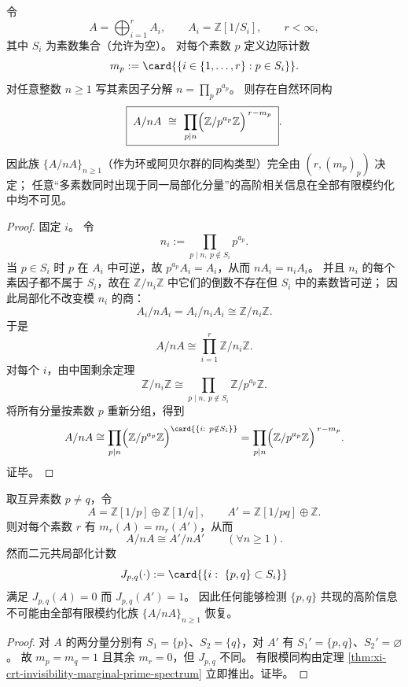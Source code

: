 \begin{theorem}\label{thm:xi-crt-invisibility-marginal-prime-spectrum}
令
\[
A=\bigoplus_{i=1}^{r}A_i,
\qquad
A_i=\mathbb Z[1/S_i],
\qquad
r<\infty,
\]
其中 \(S_i\) 为素数集合（允许为空）。
对每个素数 \(p\) 定义边际计数
\[
m_p:=\card{\{i\in\{1,\dots,r\}:p\in S_i\}}.
\]
对任意整数 \(n\ge 1\) 写其素因子分解 \(n=\prod_{p}p^{a_p}\)。
则存在自然环同构
\[
\boxed{\;
A/nA\ \cong\ \prod_{p\mid n}\Bigl(\mathbb Z/p^{a_p}\mathbb Z\Bigr)^{\,r-m_p}\; }.
\]
因此族 \(\{A/nA\}_{n\ge 1}\)（作为环或阿贝尔群的同构类型）完全由 \((r,(m_p)_p)\) 决定；
任意“多素数同时出现于同一局部化分量”的高阶相关信息在全部有限模约化中均不可见。
\end{theorem}
\begin{proof}
固定 \(i\)。
令
\[
n_i:=\prod_{p\mid n,\ p\notin S_i}p^{a_p}.
\]
当 \(p\in S_i\) 时 \(p\) 在 \(A_i\) 中可逆，故 \(p^{a_p}A_i=A_i\)，从而 \(nA_i=n_iA_i\)。
并且 \(n_i\) 的每个素因子都不属于 \(S_i\)，故在 \(\mathbb Z/n_i\mathbb Z\) 中它们的倒数不存在但 \(S_i\) 中的素数皆可逆；
因此局部化不改变模 \(n_i\) 的商：
\[
A_i/nA_i=A_i/n_iA_i\cong \mathbb Z/n_i\mathbb Z.
\]
于是
\[
A/nA\cong \prod_{i=1}^{r}\mathbb Z/n_i\mathbb Z.
\]
对每个 \(i\)，由中国剩余定理
\[
\mathbb Z/n_i\mathbb Z\cong \prod_{p\mid n,\ p\notin S_i}\mathbb Z/p^{a_p}\mathbb Z.
\]
将所有分量按素数 \(p\) 重新分组，得到
\[
A/nA
\cong
\prod_{p\mid n}\Bigl(\mathbb Z/p^{a_p}\mathbb Z\Bigr)^{\card{\{i:\ p\notin S_i\}}}
=
\prod_{p\mid n}\Bigl(\mathbb Z/p^{a_p}\mathbb Z\Bigr)^{\,r-m_p}.
\]
证毕。
\end{proof}

\begin{corollary}[边际一致而高阶不一致的不可区分对]\label{cor:xi-crt-indistinguishable-pair}
取互异素数 \(p\neq q\)，令
\[
A=\mathbb Z[1/p]\oplus \mathbb Z[1/q],
\qquad
A'=\mathbb Z[1/pq]\oplus \mathbb Z.
\]
则对每个素数 \(r\) 有 \(m_r(A)=m_r(A')\)，从而
\[
A/nA\cong A'/nA'\qquad(\forall n\ge 1).
\]
然而二元共局部化计数
\[
J_{p,q}(\cdot):=\card{\{i:\ \{p,q\}\subset S_i\}}
\]
满足 \(J_{p,q}(A)=0\) 而 \(J_{p,q}(A')=1\)。
因此任何能够检测 \(\{p,q\}\) 共现的高阶信息不可能由全部有限模约化族 \(\{A/nA\}_{n\ge 1}\) 恢复。
\end{corollary}
\begin{proof}
对 \(A\) 的两分量分别有 \(S_1=\{p\}\)、\(S_2=\{q\}\)，对 \(A'\) 有 \(S_1'=\{p,q\}\)、\(S_2'=\varnothing\)。
故 \(m_p=m_q=1\) 且其余 \(m_r=0\)，但 \(J_{p,q}\) 不同。
有限模同构由定理 \ref{thm:xi-crt-invisibility-marginal-prime-spectrum} 立即推出。证毕。
\end{proof}

\endinput
